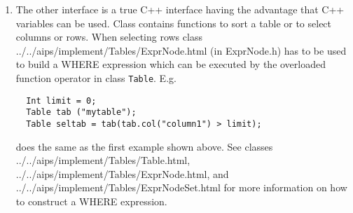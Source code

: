 \begin{itemize}
\begin{enumerate}
  \item
    The other interface is a true C++ interface having the
    advantage that C++ variables can be used. Class
    contains functions to sort a table or to select columns or rows.
    When selecting rows class 
    {../../aips/implement/Tables/ExprNode.html} (in ExprNode.h)
    has to be used to
    build a WHERE expression which can be executed by the overloaded
    function operator in class \texttt{Table}. E.g.
\begin{verbatim}
  Int limit = 0;
  Table tab ("mytable");
  Table seltab = tab(tab.col("column1") > limit);
\end{verbatim}
    does the same as the first example shown above.
    See classes 
    {../../aips/implement/Tables/Table.html},
    {../../aips/implement/Tables/ExprNode.html}, and
    {../../aips/implement/Tables/ExprNodeSet.html} for more
    information on how to construct a WHERE expression.
  \end{enumerate}
  
\end{itemize}

